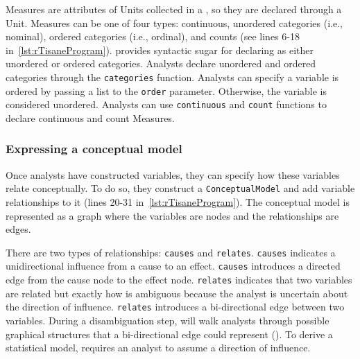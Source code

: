 Measures are attributes of Units collected in a \dataSet, so they are declared
through a Unit. Measures can be one of four
types: continuous, unordered categories (i.e., nominal), ordered categories
(i.e., ordinal), and counts (see lines 6-18 in~\autoref{lst:rTisaneProgram}). \rTisane provides syntactic sugar for declaring
\Conditions as either unordered or ordered categories. Analysts declare
unordered and ordered categories through the \texttt{categories} function.
Analysts can specify a variable is ordered by passing a list to the
\texttt{order} parameter. Otherwise, the variable is considered unordered.
Analysts can use \texttt{continuous} and \texttt{count} functions to declare
continuous and count Measures. 


\begin{comment}
Units
syntactic sugar: `Participant'

Measures
syntactic sugar: `condition'
\end{comment}


\def\causes{\texttt{causes}\xspace}
\def\relates{\texttt{relates}\xspace}
\def\when{\texttt{when}\xspace}
\def\then{\texttt{then}\xspace}
\def\assume{\texttt{assume}\xspace}
\def\hypothesize{\texttt{hypothesize}\xspace}

\subsubsection{Expressing a conceptual model}
Once analysts have constructed variables, they can specify how these variables
relate conceptually. To do so, they construct a \texttt{ConceptualModel} and add
variable relationships to it (lines 20-31 in~\autoref{lst:rTisaneProgram}). The conceptual model %
is represented as a graph where the variables are nodes and the relationships
are edges. 

There are two types of relationships: \causes and \relates. \causes indicates a
unidirectional influence from a cause to an effect. \causes
introduces a directed edge from the cause node to the effect node. \relates
indicates that two variables are related but exactly how is ambiguous because
the analyst is uncertain about the direction of influence. \relates introduces a
bi-directional edge  between two variables. During a disambiguation step,
\rTisane will walk analysts through possible graphical structures that a
bi-directional edge could represent (\considerPossibilities). To derive a
statistical model, \rTisane requires an analyst to assume a direction of
influence.


